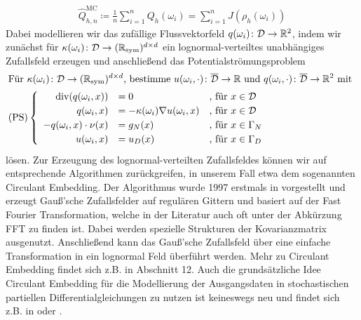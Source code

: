 \begin{align}
	\label{MC-Schätzer}
	\widehat{Q}_{h,n}^{\text{MC}} \coloneqq \frac{1}{n} \sum_{i=1}^{n} Q_h(\omega_i) = \sum_{i=1}^{n} J(\rho_h(\omega_i))
\end{align}
Dabei modellieren wir das zufällige Flussvektorfeld $ q(\omega_i)  \colon \mathcal{D} \to \mathbb{R}^2 $, indem wir zunächst für $ \kappa(\omega_i) \colon \mathcal{D} \rightarrow (\mathbb{R}_{\text{sym}})^{d \times d} $ ein lognormal-verteiltes unabhängiges Zufallsfeld erzeugen und anschließend das Potentialströmungsproblem
\begin{align*}
\setlength\arraycolsep{1pt}
&\text{Für } \kappa(\omega_i) \colon \mathcal{D} \rightarrow (\R_{\text{sym}})^{d \times d} \text{, bestimme } u(\omega_i,\cdot) \colon \overline{\mathcal{D}} \to \R \text{ und } q(\omega_i, \cdot) \colon \overline{\mathcal{D}} \to \R^2 \text{ mit } \\
&\text{(PS)}
\begin{cases}
\begin{array}{rlll}
\dive (q(\omega_i,x)) &= 0  &\text{, für } x \in \mathcal{ D}\\  
q(\omega_i,x) &= - \kappa(\omega_i) \nabla u(\omega_i,x)  &\text{, für } x \in \mathcal{D}\\
-q(\omega_i,x) \cdot \nu(x) &= g_N(x)  &\text{, für } x \in \Gamma_N \\
u(\omega_i,x) &= u_D(x)  &\text{, für } x \in \Gamma_D \\
\end{array}
\end{cases} \\
\end{align*}
lösen. Zur Erzeugung des lognormal-verteilten Zufallsfeldes können wir auf entsprechende Algorithmen zurückgreifen, in unserem Fall etwa dem sogenannten Circulant Embedding.
Der Algorithmus wurde 1997 erstmals in \cite{dietrich1997fast} vorgestellt und 
erzeugt Gauß'sche Zufallsfelder auf regulären Gittern und basiert auf der Fast Fourier Transformation, welche in der Literatur auch oft unter der Abkürzung FFT zu finden ist.
Dabei werden spezielle Strukturen der Kovarianzmatrix ausgenutzt. Anschließend kann das Gauß'sche Zufallsfeld über eine einfache Transformation in ein lognormal Feld überführt werden. Mehr zu Circulant Embedding findet sich z.B. in \cite{schmidt2014stochastic} Abschnitt 12.
Auch die grundsätzliche Idee Circulant Embedding für die Modellierung der Ausgangsdaten in stochastischen partiellen Differentialgleichungen zu nutzen ist keineswegs neu und findet sich z.B. in \cite{charrier2012strong} oder \cite{cliffe2011multilevel}.
